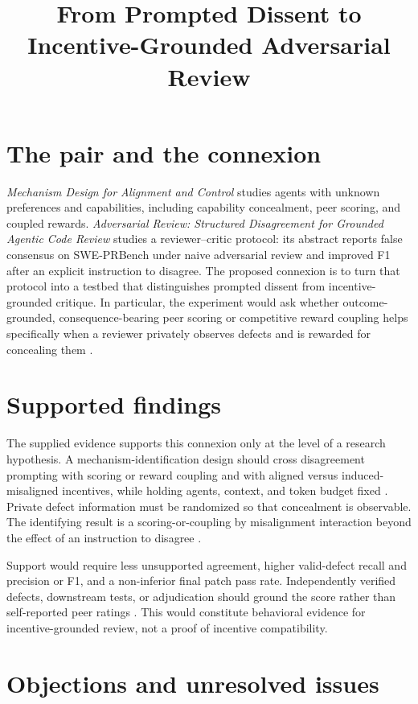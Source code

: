 \documentclass{article}
\title{From Prompted Dissent to Incentive-Grounded Adversarial Review}
\begin{document}
\maketitle

\section{The pair and the connexion}

\emph{Mechanism Design for Alignment and Control} studies agents with unknown preferences and capabilities, including capability concealment, peer scoring, and coupled rewards.  \emph{Adversarial Review: Structured Disagreement for Grounded Agentic Code Review} studies a reviewer--critic protocol: its abstract reports false consensus on SWE-PRBench under naive adversarial review and improved F1 after an explicit instruction to disagree.  The proposed connexion is to turn that protocol into a testbed that distinguishes prompted dissent from incentive-grounded critique.  In particular, the experiment would ask whether outcome-grounded, consequence-bearing peer scoring or competitive reward coupling helps specifically when a reviewer privately observes defects and is rewarded for concealing them .

\section{Supported findings}

The supplied evidence supports this connexion only at the level of a research hypothesis.  A mechanism-identification design should cross disagreement prompting with scoring or reward coupling and with aligned versus induced-misaligned incentives, while holding agents, context, and token budget fixed .  Private defect information must be randomized so that concealment is observable.  The identifying result is a scoring-or-coupling by misalignment interaction beyond the effect of an instruction to disagree .

Support would require less unsupported agreement, higher valid-defect recall and precision or F1, and a non-inferior final patch pass rate.  Independently verified defects, downstream tests, or adjudication should ground the score rather than self-reported peer ratings .  This would constitute behavioral evidence for incentive-grounded review, not a proof of incentive compatibility.

\section{Objections and unresolved issues}
\end{document}
